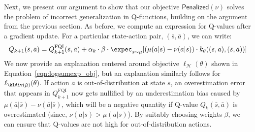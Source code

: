 Next, we present our argument to show that our objective $\mathsf{Penalized}(\nu)$ solves the problem of incorrect generalization
in Q-functions, building on the argument from the previous section. As before, we compute an expression for Q-values after a gradient update.
For a particular state-action pair, $(\bar{s}, \bar{a})$, we can write:
\begin{equation}
\label{eqn:new_kernelized_update}
    Q_{k+1}(\bar{s}, \bar{a}) = Q_{k+1}^{\text{FQI}}(\bar{s}, \bar{a}) + \alpha_k \cdot \beta \cdot \expec_{s \sim \mu} [(\mu(a|s) - \nu(a|s)) \cdot k_\theta((s, a), (\bar{s}, \bar{a}))]
\end{equation}
We now provide an explanation centered around objective $\ell_\mathcal{H}(\theta)$ shown in Equation~\ref{eqn:logsumexp_obj}, but an explanation similarly follows for $\ell_{\mathcal{\kldiv(\hat{\mu})}}(\theta)$. If action $\bar{a}$ is out-of-distribution at state $\bar{s}$, an overestimation error that appears in $Q_{k+1}^{\text{FQI}}$ now gets nullified by an underestimation bias caused by $\mu(\bar{a}|\bar{s}) - \nu(\bar{a}|\bar{s})$, which will be a negative quantity if Q-value $Q_k(\bar{s}, \bar{a})$ is overestimated (since, $\nu(\bar{a}|\bar{s}) > \mu(\bar{a}|\bar{s})$). By suitably choosing weights $\beta$, we can ensure that Q-values are not high
for out-of-distribution actions. 

